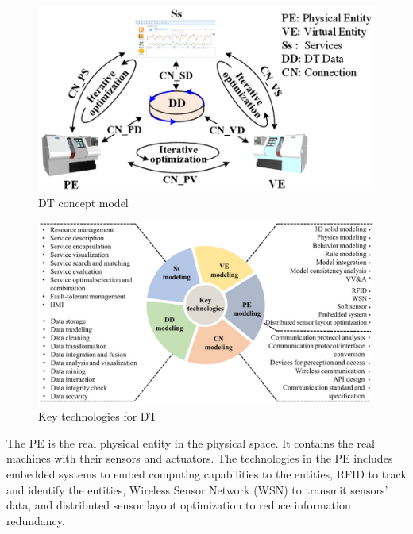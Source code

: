 \documentclass[article,table]{aaltoseries}
\begin{document}
\begin{figure}[t!]
	\begin{center}
		\includegraphics[width=1\textwidth]{figures/Tao_DT_concept_model}
		\caption{DT concept model \cite{Tao2019}}
		\label{fig:Tao_DT_concept_model}
	\end{center}
\end{figure}

\begin{figure}[t!]
	\begin{center}
		\includegraphics[width=1\textwidth]{figures/Tao_DT_key_techs}
		\caption{Key technologies for DT \cite{Tao2019}}
		\label{fig:Tao_DT_key_techs}
	\end{center}
\end{figure}

The PE is the real physical entity in the physical space. It contains the real machines with their sensors and actuators. The technologies in the PE includes embedded systems to embed computing capabilities to the entities, RFID to track and identify the entities, Wireless Sensor Network (WSN) to transmit sensors' data, and distributed sensor layout optimization to reduce information redundancy.
\end{document}
